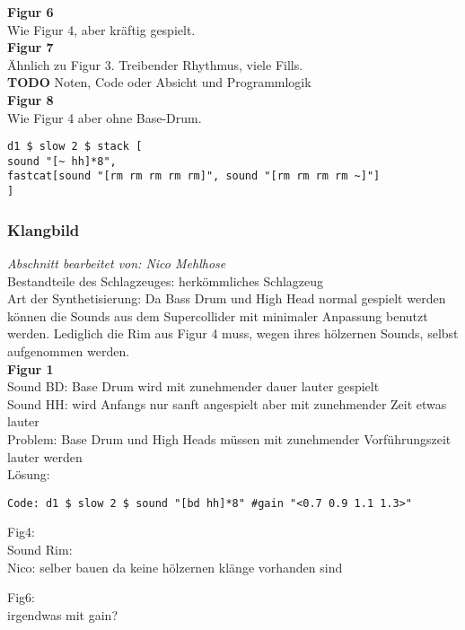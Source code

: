 \documentclass[
10pt, %
a4paper, %
oneside, %
headinclude,footinclude, %
BCOR5mm, %
]{scrartcl}
\begin{document}
\noindent \textbf{Figur 6}\\
Wie Figur 4, aber kräftig gespielt.\\

\noindent \textbf{Figur 7}\\
Ähnlich zu Figur 3. Treibender Rhythmus, viele Fills.\\
{\color{red}\textbf{TODO}} Noten, Code oder Absicht und Programmlogik\\

\noindent \textbf{Figur 8}\\
Wie Figur 4 aber ohne Base-Drum.
\begin{lstlisting}
d1 $ slow 2 $ stack [
sound "[~ hh]*8",
fastcat[sound "[rm rm rm rm rm]", sound "[rm rm rm rm ~]"]
]
\end{lstlisting}

\subsubsection{Klangbild}
\textit{Abschnitt bearbeitet von: Nico Mehlhose}\\

\noindent Bestandteile des Schlagzeuges: herkömmliches Schlagzeug\\
Art der Synthetisierung: Da Bass Drum und High Head normal gespielt werden können die Sounds aus dem Supercollider 
mit minimaler Anpassung benutzt werden. Lediglich die Rim aus Figur 4 muss, wegen ihres hölzernen Sounds, selbst 
aufgenommen werden.\\
\noindent \textbf{Figur 1}\\
Sound BD: Base Drum wird mit zunehmender dauer lauter gespielt\\
Sound HH: wird Anfangs nur sanft angespielt aber mit zunehmender Zeit etwas lauter\\
Problem: Base Drum und High Heads müssen mit zunehmender Vorführungszeit lauter werden\\ 
Lösung:\\
\begin{lstlisting}
Code: d1 $ slow 2 $ sound "[bd hh]*8" #gain "<0.7 0.9 1.1 1.3>"
\end{lstlisting}

Fig4:\\
Sound Rim: \\
Nico: selber bauen da keine hölzernen klänge vorhanden sind

Fig6:\\
irgendwas mit gain?\\
\end{document}
